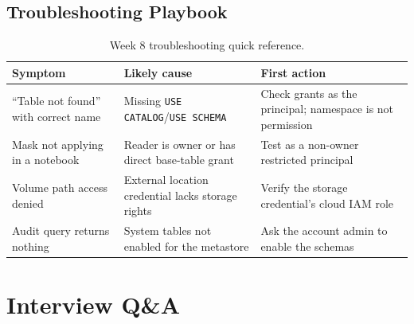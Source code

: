 \subsection{Troubleshooting Playbook}
\begin{table}[H]
\centering
\small
\begin{tabular}{@{}p{3.6cm}p{4.2cm}p{4.8cm}@{}}
\toprule
\textbf{Symptom} & \textbf{Likely cause} & \textbf{First action} \\
\midrule
``Table not found'' with correct name & Missing \texttt{USE CATALOG}/\texttt{USE SCHEMA} & Check grants as the principal; namespace is not permission \\
Mask not applying in a notebook & Reader is owner or has direct base-table grant & Test as a non-owner restricted principal \\
Volume path access denied & External location credential lacks storage rights & Verify the storage credential's cloud IAM role \\
Audit query returns nothing & System tables not enabled for the metastore & Ask the account admin to enable the schemas \\
\bottomrule
\end{tabular}
\caption{Week 8 troubleshooting quick reference.}
\label{tab:ch8-trouble}
\end{table}

\section{Interview Q\&A}
